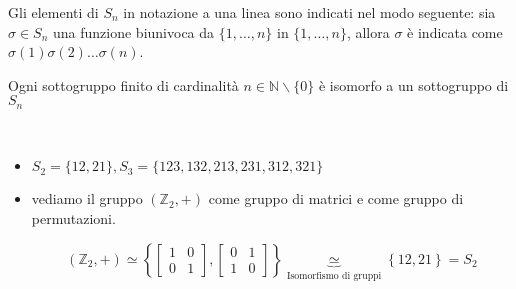 \documentclass[../main.tex]{subfiles}
\begin{document}
Gli elementi di $S_n$ in notazione a una linea sono indicati nel modo seguente: sia $\sigma \in S_n$ una funzione biunivoca da $\{1,\ldots,n\}$ in $\{1,\ldots,n\}$, allora $\sigma$ è indicata come $\sigma(1)\sigma(2)\ldots\sigma(n)$.

\begin{theorem}
    Ogni sottogruppo finito di cardinalità $n \in \mathbb{N} \backslash \{0\}$ è isomorfo a un sottogruppo di $S_n$
\end{theorem}

\begin{example}
    \
    \begin{itemize}
        \item $S_2 = \{12,21\}, S_3 = \{123,132,213,231,312,321\}$
        \item vediamo il gruppo $(\mathbb{Z}_2,+)$ come gruppo di matrici e come gruppo di permutazioni.

              \begin{equation*}
                  (\mathbb{Z}_2, +) \simeq \left\{\begin{bmatrix}
                      1 & 0 \\
                      0 & 1
                  \end{bmatrix}, \begin{bmatrix}
                      0 & 1 \\
                      1 & 0
                  \end{bmatrix}\right\} \underbrace{\simeq}_{\text{Isomorfismo di gruppi}} \left\{12,21\right\} = S_2
              \end{equation*}
    \end{itemize}
\end{example}
\end{document}
